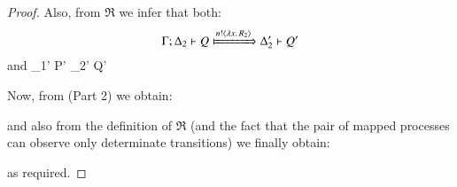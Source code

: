 \begin{proof}
	\noi
	Also, from $\Re$ we infer that both:
	\begin{eqnarray*}
		\Gamma; \Delta_2 \proves Q
		\Hby{\bactout{n}{\abs{x}{R_2}}}
		\Delta_2' \proves Q'
	\end{eqnarray*}
	and
	\mhorel
		{\Gamma}
		{\Delta_1'}
		{P' \Par {} }
		{\fwb}
		{\Delta_2'} 
		{}
		{Q' \Par {} }

	\noi
	Now, from  (Part 2) we obtain:
	
	\mhorel	{\mapt{\Gamma}}
		{}
		{ \Par \repl {}  }
		{}
		{}
		{}
		{ \Par \repl {}  }

	\noi
	and also from the definition of $\Re$ (and the fact that the pair
	of mapped processes can observe only determinate transitions) we finally obtain:

	\mhorel	{\mapt{\Gamma}}
		{}
		{ \Par \repl {}   \Par {}  \Par {} \inact }
		{\Re}
		{}
		{}
		{ \Par \repl {}   \Par {}  \Par {} \inact  }

	\noi as required.

\end{proof}




%

